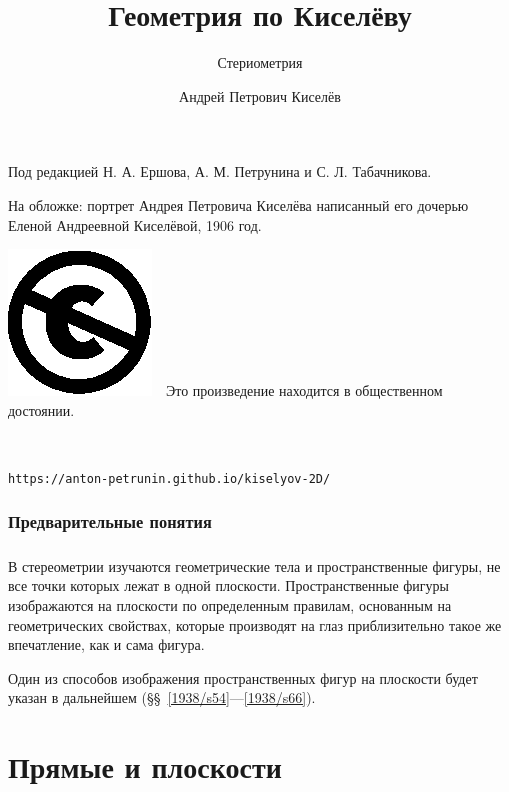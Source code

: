 \documentclass[twoside]{book}
\begin{document}
\cleardoublepage
\frontmatter
\title{Геометрия по Киселёву}
\subtitle{Стериометрия}
\author{Андрей Петрович Киселёв}
\date{}
\maketitle

\thispagestyle{empty}

Под редакцией Н. А. Ершова, А. М. Петрунина и С. Л. Табачникова.

На обложке: портрет Андрея Петровича Киселёва написанный его дочерью Еленой Андреевной Киселёвой, 1906 год.

\vfill

\noindent
\includegraphics[scale=.25]{eps/Cc-public_domain_mark_white}\ \ 
Это произведение находится в общественном достоянии.

\ 

\noindent\texttt{https://anton-petrunin.github.io/kiselyov-2D/} 

\mainmatter

\subsection*{Предварительные понятия}

\paragraph{}\label{1938/s1}
В стереометрии изучаются геометрические тела и пространственные фигуры, не все точки которых лежат в одной плоскости.
Пространственные фигуры изображаются на плоскости по определенным правилам, основанным на геометрических свойствах, которые производят на глаз приблизительно такое же впечатление, как и сама фигура.

Один из способов изображения пространственных фигур на плоскости будет указан в дальнейшем (§§~\ref{1938/s54}---\ref{1938/s66}).


\chapter{Прямые и плоскости}
\end{document}

